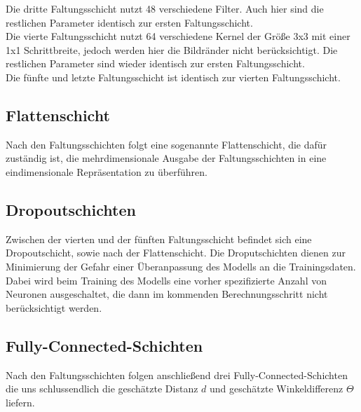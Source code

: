 Die dritte Faltungsschicht nutzt 48 verschiedene Filter. Auch hier sind die restlichen Parameter identisch zur ersten Faltungsschicht. \\

Die vierte Faltungsschicht nutzt 64 verschiedene Kernel der Größe 3x3 mit einer 1x1 Schrittbreite, jedoch werden hier die Bildränder nicht berücksichtigt. Die restlichen Parameter sind wieder identisch zur ersten Faltungsschicht. \\

Die fünfte und letzte Faltungsschicht ist identisch zur vierten Faltungsschicht.

\subsection{Flattenschicht}

Nach den Faltungsschichten folgt eine sogenannte Flattenschicht, die dafür zuständig ist, die mehrdimensionale Ausgabe der Faltungsschichten  in eine eindimensionale Repräsentation zu überführen. \cite{hhu}

\subsection{Dropoutschichten}

Zwischen der vierten und der fünften Faltungsschicht befindet sich eine Dropoutschicht, sowie nach der Flattenschicht. Die Droputschichten dienen zur Minimierung der Gefahr einer Überanpassung des Modells an die Trainingsdaten. Dabei wird beim Training des Modells eine vorher spezifizierte Anzahl von Neuronen ausgeschaltet, die dann im kommenden Berechnungsschritt nicht berücksichtigt werden. \cite{wiki2}

\subsection{Fully-Connected-Schichten}

Nach den Faltungsschichten folgen anschließend drei Fully-Connected-Schichten die uns schlussendlich die geschätzte Distanz $d$ und geschätzte Winkeldifferenz $\Theta$ liefern.

